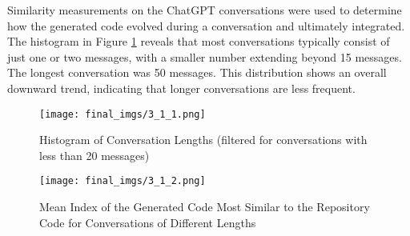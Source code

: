 Similarity measurements on the ChatGPT conversations were used to determine how the generated code evolved during a conversation and ultimately integrated. The histogram in Figure \ref{fig:fig12} reveals that most conversations typically consist of just one or two messages, with a smaller number extending beyond 15 messages. The longest conversation was 50 messages. This distribution shows an overall downward trend, indicating that longer conversations are less frequent. 

\begin{figure}[t]
    \centering
    \texttt{[image: final\_imgs/3\_1\_1.png]}
    \caption{Histogram of Conversation Lengths (filtered for conversations with less than 20 messages)}
    \label{fig:fig12}
\end{figure}


\begin{figure}[b]
    \centering
    \texttt{[image: final\_imgs/3\_1\_2.png]}
    \caption{ 
    Mean Index of the Generated Code Most Similar to the Repository Code for Conversations of Different Lengths}
    \label{fig:fig13}
\end{figure}


